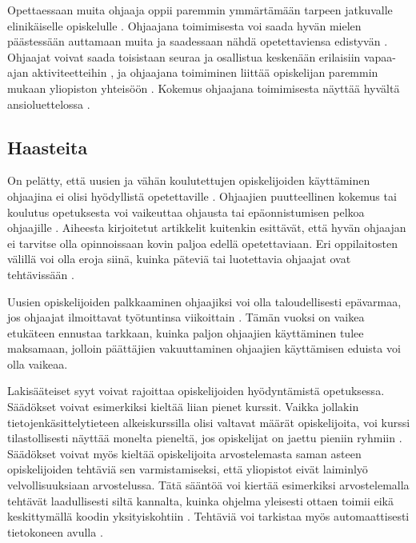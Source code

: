 \documentclass[finnish]{tktltiki2}
\theoremstyle{definition}
\theoremstyle{remark}
\begin{document}
Opettaessaan muita ohjaaja oppii paremmin ymmärtämään tarpeen jatkuvalle elinikäiselle opiskelulle \cite{Paxton05}. Ohjaajana toimimisesta voi saada hyvän mielen päästessään auttamaan muita \cite{Aminzadeh} ja saadessaan nähdä opetettaviensa edistyvän \cite{Kurhila11}. Ohjaajat voivat saada toisistaan seuraa ja osallistua keskenään erilaisiin vapaa-ajan aktiviteetteihin \cite{Roberts95}, ja ohjaajana toimiminen liittää opiskelijan paremmin mukaan yliopiston yhteisöön \cite{Dickson11}. Kokemus ohjaajana toimimisesta näyttää hyvältä ansioluettelossa \cite{Ferstl10}. \par




\subsection{Haasteita}
On pelätty, että uusien ja vähän koulutettujen opiskelijoiden käyttäminen ohjaajina ei olisi hyödyllistä opetettaville \cite{Harper02}. Ohjaajien puutteellinen kokemus tai koulutus opetuksesta voi vaikeuttaa ohjausta tai epäonnistumisen pelkoa ohjaajille \cite{Mark11}. Aiheesta kirjoitetut artikkelit kuitenkin esittävät, että hyvän ohjaajan ei tarvitse olla opinnoissaan kovin paljoa edellä opetettaviaan. Eri oppilaitosten välillä voi olla eroja siinä, kuinka päteviä tai luotettavia ohjaajat ovat tehtävissään \cite{Reges03}. \par

Uusien opiskelijoiden palkkaaminen ohjaajiksi voi olla taloudellisesti epävarmaa, jos ohjaajat ilmoittavat työtuntinsa viikoittain \cite{Reges03}. Tämän vuoksi on vaikea etukäteen ennustaa tarkkaan, kuinka paljon ohjaajien käyttäminen tulee maksamaan, jolloin päättäjien vakuuttaminen ohjaajien käyttämisen eduista voi olla vaikeaa. \par

Lakisääteiset syyt voivat rajoittaa opiskelijoiden hyödyntämistä opetuksessa. Säädökset voivat esimerkiksi kieltää liian pienet kurssit. Vaikka jollakin tietojenkäsittelytieteen alkeiskurssilla olisi valtavat määrät opiskelijoita, voi kurssi tilastollisesti näyttää monelta pieneltä, jos opiskelijat on jaettu pieniin ryhmiin \cite{Reges03}. Säädökset voivat myös kieltää opiskelijoita arvostelemasta saman asteen opiskelijoiden tehtäviä sen varmistamiseksi, että yliopistot eivät laiminlyö velvollisuuksiaan arvostelussa. Tätä sääntöä voi kiertää esimerkiksi arvostelemalla tehtävät laadullisesti siltä kannalta, kuinka ohjelma yleisesti ottaen toimii eikä keskittymällä koodin yksityiskohtiin \cite{Dickson11}. Tehtäviä voi tarkistaa myös automaattisesti tietokoneen avulla \cite{Vihavainen}. \par
\end{document}
